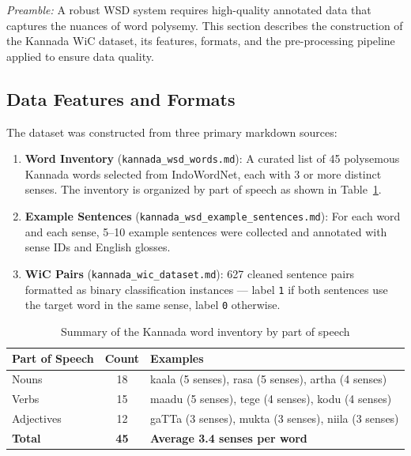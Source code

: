 \documentclass[12pt,a4paper,oneside]{article}
\begin{document}
\textit{Preamble:} A robust WSD system requires high-quality annotated data that captures the nuances of word polysemy. This section describes the construction of the Kannada WiC dataset, its features, formats, and the pre-processing pipeline applied to ensure data quality.

\subsection{Data Features and Formats}

The dataset was constructed from three primary markdown sources:

\begin{enumerate}[leftmargin=*]
  \item \textbf{Word Inventory} (\texttt{kannada\_wsd\_words.md}): A curated list of 45 polysemous Kannada words selected from IndoWordNet, each with 3 or more distinct senses. The inventory is organized by part of speech as shown in Table~\ref{tab:word_inventory}.

  \item \textbf{Example Sentences} (\texttt{kannada\_wsd\_example\_sentences.md}): For each word and each sense, 5--10 example sentences were collected and annotated with sense IDs and English glosses.

  \item \textbf{WiC Pairs} (\texttt{kannada\_wic\_dataset.md}): 627 cleaned sentence pairs formatted as binary classification instances --- label \texttt{1} if both sentences use the target word in the same sense, label \texttt{0} otherwise.
\end{enumerate}

\begin{table}[H]
\centering
\caption{Summary of the Kannada word inventory by part of speech}
\label{tab:word_inventory}
\begin{tabular}{l c l}
\toprule
\textbf{Part of Speech} & \textbf{Count} & \textbf{Examples} \\
\midrule
Nouns & 18 & kaala (5 senses), rasa (5 senses), artha (4 senses) \\
Verbs & 15 & maadu (5 senses), tege (4 senses), kodu (4 senses) \\
Adjectives & 12 & gaTTa (3 senses), mukta (3 senses), niila (3 senses) \\
\midrule
\textbf{Total} & \textbf{45} & \textbf{Average 3.4 senses per word} \\
\bottomrule
\end{tabular}
\end{table}
\end{document}
